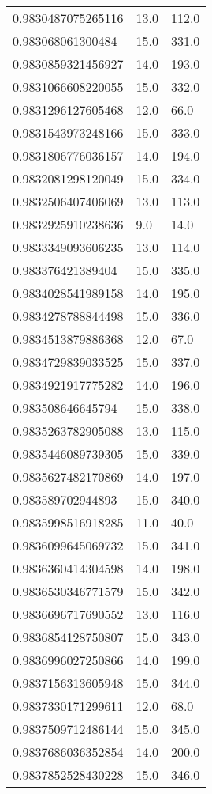\begin{center}
\begin{supertabular}[H]{p{0.30\textwidth}p{0.05\textwidth}p{0.05\textwidth}}
0.9830487075265116 & 13.0 & 112.0 \\ 
0.983068061300484 & 15.0 & 331.0 \\ 
0.9830859321456927 & 14.0 & 193.0 \\ 
0.9831066608220055 & 15.0 & 332.0 \\ 
0.9831296127605468 & 12.0 & 66.0 \\ 
0.9831543973248166 & 15.0 & 333.0 \\ 
0.9831806776036157 & 14.0 & 194.0 \\ 
0.9832081298120049 & 15.0 & 334.0 \\ 
0.9832506407406069 & 13.0 & 113.0 \\ 
0.9832925910238636 & 9.0 & 14.0 \\ 
0.9833349093606235 & 13.0 & 114.0 \\ 
0.983376421389404 & 15.0 & 335.0 \\ 
0.9834028541989158 & 14.0 & 195.0 \\ 
0.9834278788844498 & 15.0 & 336.0 \\ 
0.9834513879886368 & 12.0 & 67.0 \\ 
0.9834729839033525 & 15.0 & 337.0 \\ 
0.9834921917775282 & 14.0 & 196.0 \\ 
0.983508646645794 & 15.0 & 338.0 \\ 
0.9835263782905088 & 13.0 & 115.0 \\ 
0.9835446089739305 & 15.0 & 339.0 \\ 
0.9835627482170869 & 14.0 & 197.0 \\ 
0.983589702944893 & 15.0 & 340.0 \\ 
0.9835998516918285 & 11.0 & 40.0 \\ 
0.9836099645069732 & 15.0 & 341.0 \\ 
0.9836360414304598 & 14.0 & 198.0 \\ 
0.9836530346771579 & 15.0 & 342.0 \\ 
0.9836696717690552 & 13.0 & 116.0 \\ 
0.9836854128750807 & 15.0 & 343.0 \\ 
0.9836996027250866 & 14.0 & 199.0 \\ 
0.9837156313605948 & 15.0 & 344.0 \\ 
0.9837330171299611 & 12.0 & 68.0 \\ 
0.9837509712486144 & 15.0 & 345.0 \\ 
0.9837686036352854 & 14.0 & 200.0 \\ 
0.9837852528430228 & 15.0 & 346.0 \\ 

\end{supertabular}
\end{center}
